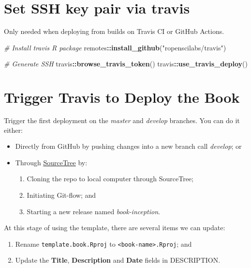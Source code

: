 \documentclass[]{book}
\newenvironment{Shaded}{\begin{snugshade}}{\end{snugshade}}
\newcommand{\CommentTok}[1]{\textcolor[rgb]{0.56,0.35,0.01}{\textit{#1}}}
\newcommand{\KeywordTok}[1]{\textcolor[rgb]{0.13,0.29,0.53}{\textbf{#1}}}
\newcommand{\NormalTok}[1]{#1}
\newcommand{\OperatorTok}[1]{\textcolor[rgb]{0.81,0.36,0.00}{\textbf{#1}}}
\newcommand{\StringTok}[1]{\textcolor[rgb]{0.31,0.60,0.02}{#1}}
\providecommand{\tightlist}{%
  \setlength{\itemsep}{0pt}\setlength{\parskip}{0pt}}
\begin{document}
\hypertarget{set-ssh-key-pair-via-travis}{%
\section{Set SSH key pair via travis}\label{set-ssh-key-pair-via-travis}}

Only needed when deploying from builds on Travis CI or GitHub Actions.

\begin{Shaded}
\begin{Highlighting}[]
\CommentTok{# Install travis R package}
\NormalTok{remotes}\OperatorTok{::}\KeywordTok{install_github}\NormalTok{(}\StringTok{"ropenscilabs/travis"}\NormalTok{)}

\CommentTok{# Generate SSH}
\NormalTok{travis}\OperatorTok{::}\KeywordTok{browse_travis_token}\NormalTok{()}
\NormalTok{travis}\OperatorTok{::}\KeywordTok{use_travis_deploy}\NormalTok{()}
\end{Highlighting}
\end{Shaded}

\hypertarget{trigger-travis-to-deploy-the-book}{%
\section{Trigger Travis to Deploy the Book}\label{trigger-travis-to-deploy-the-book}}

Trigger the first deployment on the \emph{master} and \emph{develop} branches.
You can do it either:

\begin{itemize}
\tightlist
\item
  Directly from GitHub by pushing changes into a new branch call \emph{develop}; or
\item
  Through \href{https://www.sourcetreeapp.com/}{SourceTree} by:

  \begin{enumerate}
  \def\labelenumi{\arabic{enumi}.}
  \tightlist
  \item
    Cloning the repo to local computer through SourceTree;
  \item
    Initiating Git-flow; and
  \item
    Starting a new release named \emph{book-inception}.
  \end{enumerate}
\end{itemize}

At this stage of using the template, there are several items we can update:

\begin{enumerate}
\def\labelenumi{\arabic{enumi}.}
\tightlist
\item
  Rename \texttt{template.book.Rproj} to \texttt{\textless{}book-name\textgreater{}.Rproj}; and
\item
  Update the \textbf{Title}, \textbf{Description} and \textbf{Date} fields in DESCRIPTION.
\end{enumerate}
\end{document}
